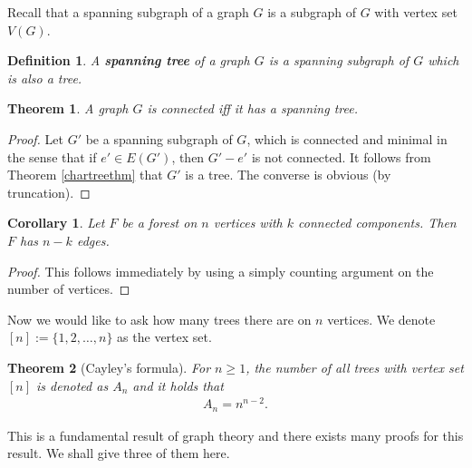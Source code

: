 \documentclass[12pt,a4paper]{article}
\newtheorem{thm}{Theorem}[section]
\newtheorem{cor}{Corollary}[section]
\newtheorem{defn}{Definition}[section]
\theoremstyle{definition}
\begin{document}
Recall that a spanning subgraph of a graph $G$ is a subgraph of $G$ with vertex set $V(G)$. 
\begin{defn} A \textbf{spanning tree} of a graph $G$ is a spanning subgraph of $G$ which is also a tree. 
\end{defn}
\begin{thm} A graph $G$ is connected iff it has a spanning tree.
\end{thm}
\begin{proof}
Let $G'$ be a spanning subgraph of $G$, which is connected and minimal in the sense that if $e' \in E(G')$,  then $G'-e'$ is not connected. It follows from Theorem \ref{chartreethm} that $G'$ is a tree. The converse is obvious (by truncation). 
\end{proof}
\begin{cor} Let $F$ be a forest on $n$ vertices with $k$ connected components. Then $F$ has $n-k$ edges. 
\end{cor}
\begin{proof}
This follows immediately by using a simply counting argument on the number of vertices. 
\end{proof}
\newpage
Now we would like to ask how many trees there are on $n$ vertices. We denote $[n]:= \{1,2, \dots ,  n \}$ as the vertex set. 
\begin{thm}[Cayley's formula] For $n \geq 1$, the number of all trees with vertex set $[n]$ is denoted as $A_n$ and it holds that 
\begin{align*}
A_n = n^{n-2}.
\end{align*}
\end{thm}
This is a fundamental result of graph theory and there exists many proofs for this result. We shall give three of them here.
\end{document}
